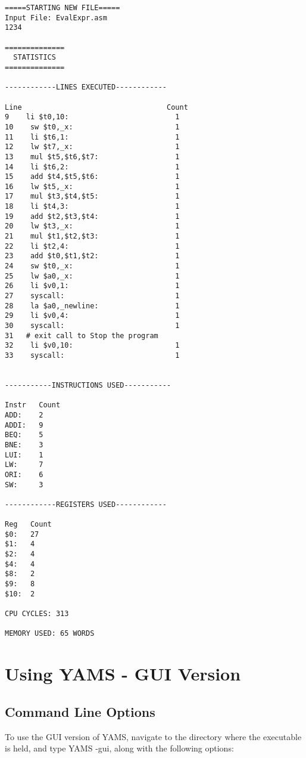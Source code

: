 \documentclass[12pt]{report}
\begin{document}
\begin{verbatim}
=====STARTING NEW FILE=====
Input File: EvalExpr.asm
1234

==============
  STATISTICS
==============

------------LINES EXECUTED------------

Line                                  Count
9    li $t0,10:                         1
10    sw $t0,_x:                        1
11    li $t6,1:                         1
12    lw $t7,_x:                        1
13    mul $t5,$t6,$t7:                  1
14    li $t6,2:                         1
15    add $t4,$t5,$t6:                  1
16    lw $t5,_x:                        1
17    mul $t3,$t4,$t5:                  1
18    li $t4,3:                         1
19    add $t2,$t3,$t4:                  1
20    lw $t3,_x:                        1
21    mul $t1,$t2,$t3:                  1
22    li $t2,4:                         1
23    add $t0,$t1,$t2:                  1
24    sw $t0,_x:                        1
25    lw $a0,_x:                        1
26    li $v0,1:                         1
27    syscall:                          1
28    la $a0,_newline:                  1
29    li $v0,4:                         1
30    syscall:                          1
31   # exit call to Stop the program
32    li $v0,10:                        1
33    syscall:                          1


-----------INSTRUCTIONS USED-----------

Instr   Count
ADD:    2
ADDI:   9
BEQ:    5
BNE:    3
LUI:    1
LW:     7
ORI:    6
SW:     3

------------REGISTERS USED------------

Reg   Count
$0:   27
$1:   4
$2:   4
$4:   4
$8:   2
$9:   8
$10:  2

CPU CYCLES: 313

MEMORY USED: 65 WORDS
\end{verbatim}


\section{Using YAMS - GUI Version}

\subsection{Command Line Options}
To use the GUI version of YAMS, navigate to the directory where the executable is held, and type  YAMS -gui, along with the following options:
\end{document}

